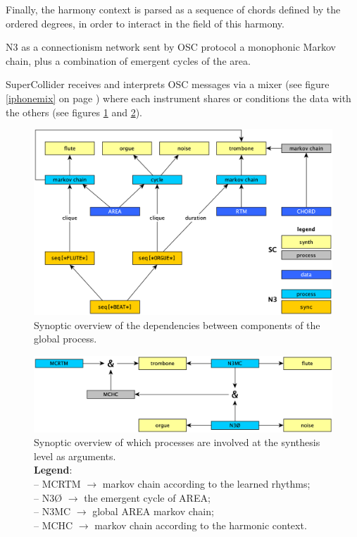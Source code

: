 \documentclass{article}
\begin{document}
Finally, the harmony context is parsed as a sequence of chords defined by the ordered degrees, in order to interact in the field of this harmony.

\bigskip

N3 as a connectionism network sent by OSC protocol a monophonic Markov chain, plus a combination of emergent cycles of the area.

SuperCollider receives and interprets OSC messages via a mixer (see figure \ref{iphonemix} on page \pageref{iphonemix}) where each instrument shares or conditions the data with the others (see figures \ref{deps} and  \ref{share}).

\begin{figure}[htbp]
\centering
\includegraphics[width=\textwidth]{../img/9902}
\caption{Synoptic overview of the dependencies between components of the global process.}
\label{deps}
\end{figure}

\begin{figure}[htbp]
\centering
\includegraphics[width=\textwidth]{../img/9903}
\caption{Synoptic overview of which processes are involved at the synthesis level as arguments. \\ \textbf{Legend}:\\ -- \textsf{\footnotesize MCRTM} $\rightarrow$ markov chain according to the learned rhythms;\\ -- \textsf{\footnotesize N3Ø} $\rightarrow$ the emergent cycle of AREA;\\ -- \textsf{\footnotesize N3MC} $\rightarrow$ global AREA markov chain;\\ --   \textsf{\footnotesize MCHC} $\rightarrow$ markov chain according to the harmonic context.}
\label{share}
\end{figure}
\end{document}
